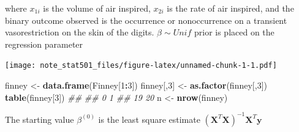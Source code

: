 \documentclass[
]{article}
\newenvironment{Shaded}{\begin{snugshade}}{\end{snugshade}}
\newcommand{\CommentTok}[1]{\textcolor[rgb]{0.56,0.35,0.01}{\textit{#1}}}
\newcommand{\DataTypeTok}[1]{\textcolor[rgb]{0.13,0.29,0.53}{#1}}
\newcommand{\DecValTok}[1]{\textcolor[rgb]{0.00,0.00,0.81}{#1}}
\newcommand{\FloatTok}[1]{\textcolor[rgb]{0.00,0.00,0.81}{#1}}
\newcommand{\KeywordTok}[1]{\textcolor[rgb]{0.13,0.29,0.53}{\textbf{#1}}}
\newcommand{\NormalTok}[1]{#1}
\newcommand{\OperatorTok}[1]{\textcolor[rgb]{0.81,0.36,0.00}{\textbf{#1}}}
\newcommand{\StringTok}[1]{\textcolor[rgb]{0.31,0.60,0.02}{#1}}
\begin{document}
where \(x_{1i}\) is the volume of air inspired, \(x_{2i}\) is the rate
of air inspired, and the binary outcome observed is the occurrence or
nonoccurrence on a transient vasorestriction on the skin of the digits.
\(\beta\sim Unif\) prior is placed on the regression parameter

\begin{Shaded}
\end{Shaded}

\texttt{[image: note\_stat501\_files/figure-latex/unnamed-chunk-1-1.pdf]}

\begin{Shaded}
\begin{Highlighting}[]

\NormalTok{finney <-}\StringTok{ }\KeywordTok{data.frame}\NormalTok{(Finney[}\DecValTok{1}\OperatorTok{:}\DecValTok{3}\NormalTok{])}
\NormalTok{finney[,}\DecValTok{3}\NormalTok{] <-}\StringTok{ }\KeywordTok{as.factor}\NormalTok{(finney[,}\DecValTok{3}\NormalTok{])}
\KeywordTok{table}\NormalTok{(finney[}\DecValTok{3}\NormalTok{])}
\CommentTok{## }
\CommentTok{##  0  1 }
\CommentTok{## 19 20}
\NormalTok{n <-}\StringTok{ }\KeywordTok{nrow}\NormalTok{(finney)}
\end{Highlighting}
\end{Shaded}

The starting value \(\beta^{(0)}\) is the least square estimate
\((\mathbf{X}^T\mathbf{X})^{-1}\mathbf{X}^T\mathbf{y}\)
\end{document}

